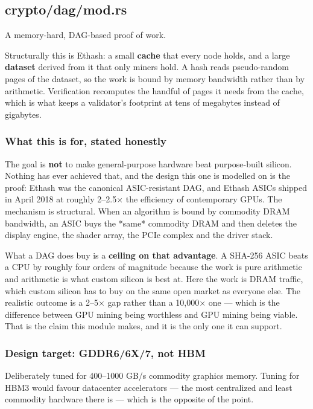 \documentclass[11pt,a4paper]{article}
\begin{document}
\subsection{crypto/dag/mod.rs}
A memory-hard, DAG-based proof of work.

Structurally this is Ethash: a small \textbf{cache} that every node holds, and a
large \textbf{dataset} derived from it that only miners hold. A hash reads
pseudo-random pages of the dataset, so the work is bound by memory bandwidth
rather than by arithmetic. Verification recomputes the handful of pages it
needs from the cache, which is what keeps a validator's footprint at tens of
megabytes instead of gigabytes.

\subsubsection{What this is for, stated honestly}

The goal is \textbf{not} to make general-purpose hardware beat purpose-built
silicon. Nothing has ever achieved that, and the design this one is modelled
on is the proof: Ethash was the canonical ASIC-resistant DAG, and Ethash
ASICs shipped in April 2018 at roughly 2–2.5× the efficiency of contemporary
GPUs. The mechanism is structural. When an algorithm is bound by commodity
DRAM bandwidth, an ASIC buys the *same* commodity DRAM and then deletes the
display engine, the shader array, the PCIe complex and the driver stack.

What a DAG does buy is a \textbf{ceiling on that advantage}. A SHA-256 ASIC beats
a CPU by roughly four orders of magnitude because the work is pure
arithmetic and arithmetic is what custom silicon is best at. Here the work is
DRAM traffic, which custom silicon has to buy on the same open market as
everyone else. The realistic outcome is a 2–5× gap rather than a 10,000×
one — which is the difference between GPU mining being worthless and GPU
mining being viable. That is the claim this module makes, and it is the only
one it can support.

\subsubsection{Design target: GDDR6/6X/7, not HBM}

Deliberately tuned for 400–1000 GB/s commodity graphics memory. Tuning for
HBM3 would favour datacenter accelerators — the most centralized and least
commodity hardware there is — which is the opposite of the point.
\end{document}

